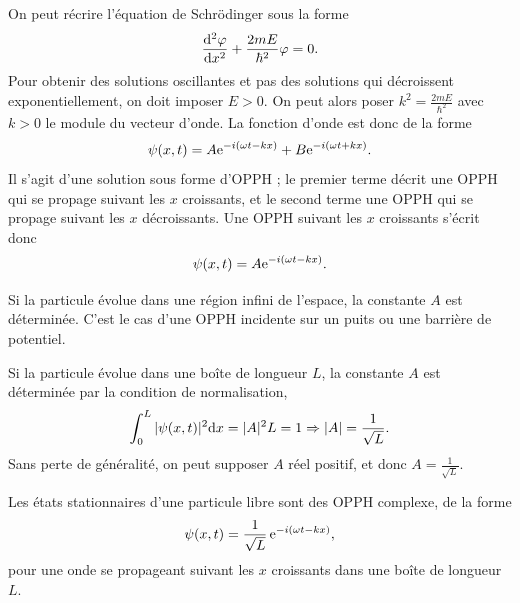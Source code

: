 \documentclass[12pt,fancy]{cours}
\begin{document}
 On peut récrire l’équation de Schrödinger sous la forme
\begin{equation*}
\frac{\mathrm{d}^2\varphi}{\mathrm{d} x^2} + \frac{2mE}{\hbar^2} \varphi=0.
\end{equation*}
Pour obtenir des solutions oscillantes et pas des solutions qui décroissent exponentiellement, on doit imposer $E>0$. On peut alors poser $k^2 = \frac{2mE}{\hbar^2}$ avec $k>0$ le module du vecteur d’onde. La fonction d’onde est donc de la forme
\begin{equation}
\psi(x,t)=A\mathrm{e}^{-i(\omega t-kx)} +B\mathrm{e}^{-i(\omega t+kx)}.
\label{eqn:oppqh}
\end{equation}
Il s’agit d’une solution sous forme d’OPPH ; le premier terme décrit une OPPH qui se propage suivant les $x$ croissants, et le second terme une OPPH qui se propage suivant les $x$ décroissants. Une OPPH suivant les $x$ croissants s'écrit donc 
\begin{equation}
\psi(x,t)=A\mathrm{e}^{-i(\omega t-kx)}.
\end{equation}
\begin{liste}
  \item Si la particule évolue dans une région infini de l'espace, la constante $A$ est déterminée. C'est le cas d'une OPPH incidente sur un puits ou une barrière de potentiel.
  \item Si la particule évolue dans une boîte de longueur $L$, la constante $A$ est déterminée par la condition de normalisation,
  \begin{equation}
    \int_{0}^{L} |\psi(x,t)|^2 \mathrm{d} x = |A|^2 L = 1 \Rightarrow |A| = \frac{1}{\sqrt{L}}.
  \end{equation}
  Sans perte de généralité, on peut supposer $A$ réel positif, et donc $A=\frac{1}{\sqrt{L}}$.
\end{liste}
\begin{prop}\label{prop:}
  Les états stationnaires d’une particule libre sont des OPPH complexe, de la forme
\begin{equation*}
\psi(x,t)=\frac{1}{\sqrt{L}}\,\mathrm{e}^{-i(\omega t-kx)},
\end{equation*}
pour une onde se propageant suivant les $x$ croissants dans une boîte de longueur $L$.
\end{prop}
\end{document}

